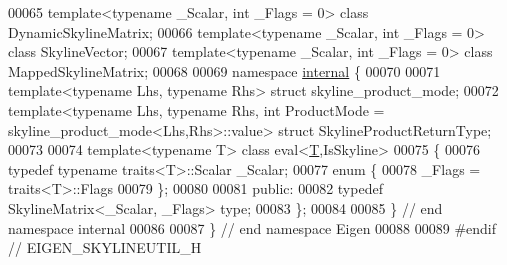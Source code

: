 \begin{DoxyCode}
00065 \textcolor{keyword}{template}<\textcolor{keyword}{typename} \_Scalar, \textcolor{keywordtype}{int} \_Flags = 0> \textcolor{keyword}{class }DynamicSkylineMatrix;
00066 \textcolor{keyword}{template}<\textcolor{keyword}{typename} \_Scalar, \textcolor{keywordtype}{int} \_Flags = 0> \textcolor{keyword}{class }SkylineVector;
00067 \textcolor{keyword}{template}<\textcolor{keyword}{typename} \_Scalar, \textcolor{keywordtype}{int} \_Flags = 0> \textcolor{keyword}{class }MappedSkylineMatrix;
00068 
00069 \textcolor{keyword}{namespace }\hyperlink{namespaceinternal}{internal} \{
00070 
00071 \textcolor{keyword}{template}<\textcolor{keyword}{typename} Lhs, \textcolor{keyword}{typename} Rhs> \textcolor{keyword}{struct }skyline\_product\_mode;
00072 template<typename Lhs, typename Rhs, int ProductMode = skyline\_product\_mode<Lhs,Rhs>::value> \textcolor{keyword}{struct }
      SkylineProductReturnType;
00073 
00074 \textcolor{keyword}{template}<\textcolor{keyword}{typename} T> \textcolor{keyword}{class }eval<\hyperlink{group___sparse_core___module_class_eigen_1_1_triplet}{T},IsSkyline>
00075 \{
00076     \textcolor{keyword}{typedef} \textcolor{keyword}{typename} traits<T>::Scalar \_Scalar;
00077     \textcolor{keyword}{enum} \{
00078           \_Flags = traits<T>::Flags
00079     \};
00080 
00081   \textcolor{keyword}{public}:
00082     \textcolor{keyword}{typedef} SkylineMatrix<\_Scalar, \_Flags> type;
00083 \};
00084 
00085 \} \textcolor{comment}{// end namespace internal}
00086 
00087 \} \textcolor{comment}{// end namespace Eigen}
00088 
00089 \textcolor{preprocessor}{#endif // EIGEN\_SKYLINEUTIL\_H}
\end{DoxyCode}

